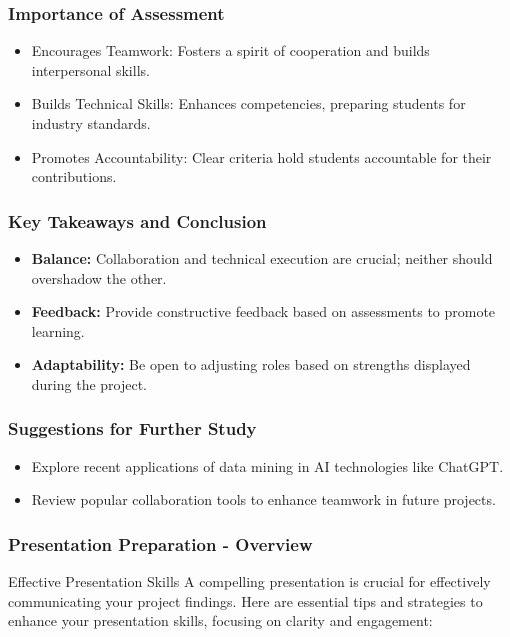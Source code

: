 \documentclass[aspectratio=169]{beamer}
\begin{document}
\begin{frame}
    \frametitle{Importance of Assessment}
    \begin{itemize}
        \item Encourages Teamwork: Fosters a spirit of cooperation and builds interpersonal skills.
        \item Builds Technical Skills: Enhances competencies, preparing students for industry standards.
        \item Promotes Accountability: Clear criteria hold students accountable for their contributions.
    \end{itemize}
\end{frame}

\begin{frame}
    \frametitle{Key Takeaways and Conclusion}
    \begin{itemize}
        \item \textbf{Balance:} Collaboration and technical execution are crucial; neither should overshadow the other.
        \item \textbf{Feedback:} Provide constructive feedback based on assessments to promote learning.
        \item \textbf{Adaptability:} Be open to adjusting roles based on strengths displayed during the project.
    \end{itemize}
\end{frame}

\begin{frame}
    \frametitle{Suggestions for Further Study}
    \begin{itemize}
        \item Explore recent applications of data mining in AI technologies like ChatGPT.
        \item Review popular collaboration tools to enhance teamwork in future projects.
    \end{itemize}
\end{frame}

\begin{frame}[fragile]
    \frametitle{Presentation Preparation - Overview}
    \begin{block}{Effective Presentation Skills}
        A compelling presentation is crucial for effectively communicating your project findings. Here are essential tips and strategies to enhance your presentation skills, focusing on clarity and engagement:
    \end{block}
\end{frame}
\end{document}
